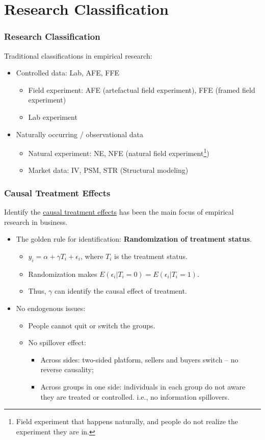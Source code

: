 \documentclass[10pt]{beamer}
\begin{document}
\section{Research Classification}
\begin{frame}
\frametitle{Research Classification}
Traditional classifications in empirical research:
\begin{itemize}
    \item Controlled data: Lab, AFE, FFE
    \begin{itemize}
        \item Field experiment: AFE (artefactual field experiment), FFE (framed field experiment)
        \item Lab experiment
    \end{itemize}
    \item Naturally occurring / observational data
    \begin{itemize}
        \item Natural experiment: NE, NFE (natural field experiment\footnote{Field experiment that happens naturally, and people do not realize the experiment they are in.})
        \item Market data: IV, PSM, STR (Structural modeling)
    \end{itemize}
\end{itemize}
\end{frame}

\begin{frame}
\frametitle{Causal Treatment Effects}
Identify the \underline{causal treatment effects} has been the main focus of empirical research in business.
\begin{itemize}
    \item The golden rule for identification: \textbf{Randomization of treatment status}.
    \begin{itemize}
        \item $y_i = \alpha + \gamma T_i + \epsilon_i$, where $T_i$ is the treatment status.
        \item Randomization makes $E(\epsilon_i | T_i = 0) = E(\epsilon_i | T_i = 1)$.
        \item Thus, $\gamma$ can identify the causal effect of treatment.
    \end{itemize}
    \item No endogenous issues: 
    \begin{itemize}
        \item People cannot quit or switch the groups.
        \item No spillover effect:
        \begin{itemize}
            \item Across sides: two-sided platform, sellers and buyers switch -- no reverse causality;
            \item Across groups in one side: individuals in each group do not aware they are treated or controlled. i.e., no information spillovers.
        \end{itemize}
    \end{itemize}
\end{itemize}
\end{frame}
\end{document}
